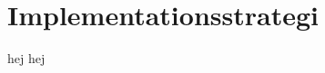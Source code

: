 \documentclass[designspec/spec.tex]{subfiles}
\begin{document}
\section{Implementationsstrategi}

hej hej
\end{document}
